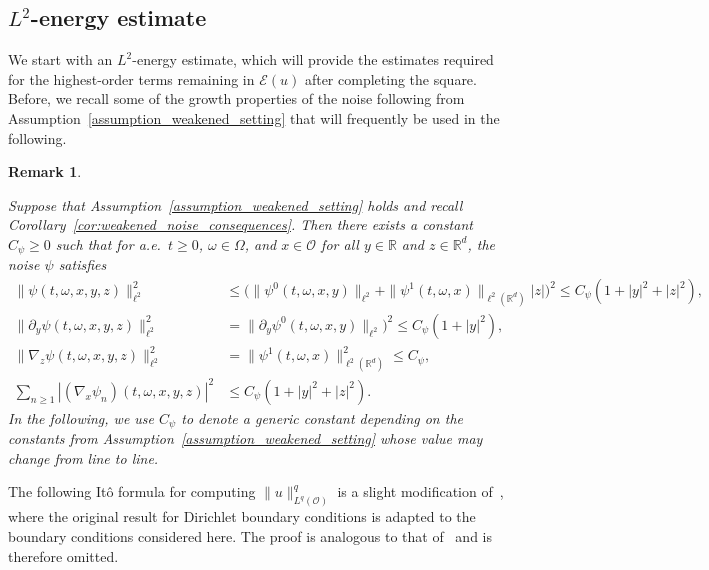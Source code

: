 \documentclass[reqno]{amsart}
\newtheorem{remark}[Satz]{Remark}
\newcommand{\R}{\mathbb{R}}
\newcommand{\sO}{\mathscr{O}}
\newcommand{\1}{\mathbf{1}}
\newcommand{\grad}{\nabla}
\begin{document}
\subsection{\texorpdfstring{$L^2$}{\textit{L2}}-energy estimate}
\label{subsec:L2energyEst}

We start with an $L^2$-energy estimate, which will provide the estimates required for the highest-order terms remaining in $\mathcal{E}(u)$ after completing the square. Before, we recall some of the growth properties of the noise following from Assumption~\ref{assumption_weakened_setting} that will frequently be used in the following. 

\begin{remark}\label{remark:assumptionsNoiseGlobal}

Suppose that Assumption~\ref{assumption_weakened_setting} holds and recall Corollary~\ref{cor:weakened_noise_consequences}. Then there exists a constant $C_\psi\ge 0$ such that for a.e.\ $t\ge 0$, $\omega\in\Omega$, and $x\in\sO$ for all $y\in \R$ and $z\in\R^d$, the noise $\psi$ satisfies
\begin{align}\label{eq:noiseLinGrowthyz}
   \| \psi(t,\omega,x,y,z)\|_{\ell^2}^2&\leq \big(\| \psi^0(t,\omega,x,y)\|_{\ell^2} + \| \psi^1(t,\omega,x)\|_{\ell^2(\R^d)} |z|\big)^2 \le C_\psi (1+|y|^2+|z|^2),\\
   \|\partial_y \psi(t,\omega,x,y,z)\|_{\ell^2}^2 & = \|\partial_y \psi^0(t,\omega,x,y)\|_{\ell^2})^2 \le C_\psi(1+|y|^2), \\ 
  \|\grad_z \psi(t,\omega,x,y,z)\|_{\ell^2}^2 & = \|\psi^1(t,\omega,x)\|_{\ell^2(\R^d)}^2 \le C_\psi, \\
  \sum_{n\ge 1}|(\grad_x\psi_n)(t,\omega,x,y,z)|^2 &\le C_\psi (1+|y|^2+|z|^2).
\end{align}
In the following, we use $C_\psi$ to denote a generic constant depending on the constants from Assumption~\ref{assumption_weakened_setting} whose value may change from line to line.
\end{remark}

The following Itô formula for computing $\|u\|_{L^{q}(\sO)}^q$ is a slight modification of~\cite[Lemma A.6]{agrestiNonlinearSPDEsMaximal2025}, where the original result for Dirichlet boundary conditions is adapted to the boundary conditions considered here. The proof is analogous to that of~\cite[Lemma A.6]{agrestiNonlinearSPDEsMaximal2025} and is therefore omitted.
\end{document}

